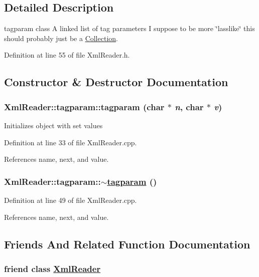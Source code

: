 \subsection{Detailed Description}
tagparam class A linked list of tag parameters I suppose to be more \char`\"{}lasslike\char`\"{} this should probably just be a \hyperlink{classCollection}{Collection}. 



Definition at line 55 of file Xml\-Reader.h.

\subsection{Constructor \& Destructor Documentation}
\hypertarget{classXmlReader_1_1tagparam_a0}{
\subsubsection[tagparam]{\setlength{\rightskip}{0pt plus 5cm}Xml\-Reader::tagparam::tagparam (char $\ast$ {\em n}, char $\ast$ {\em v})}}
\label{classXmlReader_1_1tagparam_a0}


Initializes object with set values 

Definition at line 33 of file Xml\-Reader.cpp.

References name, next, and value.\hypertarget{classXmlReader_1_1tagparam_a1}{
\subsubsection[$\sim$tagparam]{\setlength{\rightskip}{0pt plus 5cm}Xml\-Reader::tagparam::$\sim$\hyperlink{classXmlReader_1_1tagparam}{tagparam} ()}}
\label{classXmlReader_1_1tagparam_a1}




Definition at line 49 of file Xml\-Reader.cpp.

References name, next, and value.

\subsection{Friends And Related Function Documentation}
\hypertarget{classXmlReader_1_1tagparam_n0}{
\subsubsection[XmlReader]{\setlength{\rightskip}{0pt plus 5cm}friend class \hyperlink{classXmlReader}{Xml\-Reader}}}
\label{classXmlReader_1_1tagparam_n0}




